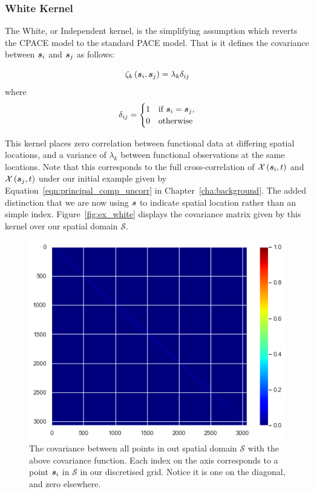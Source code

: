 \subsubsection{White Kernel \label{sssec:white_kern}}
The White, or Independent kernel, is the simplifying assumption which reverts the CPACE model to the standard PACE model. That is it defines the covariance between $\bm{{s}}_{i}$ and $\bm{{s}}_{j}$ as follows:

\begin{equation}
	\zeta_k\left(\bm{{s}}_{i}, \bm{{s}}_{j}\right) = \lambda_k\delta_{ij}
\end{equation}
where 
\begin{equation*}
\delta_{ij} = \begin{cases}
	1 & \text{if } \bm{{s}}_{i} = \bm{{s}}_{j}, \\
	0 & \text{otherwise}
\end{cases} 
\end{equation*}

This kernel places zero correlation between functional data at differing spatial locations, and a variance of $\lambda_k$ between functional observations at the same locations.
Note that this corresponds to the full cross-correlation of $\mathcal{X}\left(\bm{{s}}_{i}, t \right)$ and  $\mathcal{X}\left(\bm{{s}}_{j}, t \right)$ under our initial example given by Equation~\ref{eqn:principal_comp_uncorr} in Chapter~\ref{cha:background}.
The added distinction that we are now using $\bm{{s}}$ to indicate spatial location rather than an simple index.
Figure~\ref{fig:ex_white} displays the covariance matrix given by this kernel over our spatial domain $\mathcal{S}$. 

\begin{figure}
	\centering
	\includegraphics[width=\textwidth]{ex_white}
	\caption{The covariance between all points in out spatial domain $\mathcal{S}$ with the above covariance function. Each index on the axis corresponds to a point $\bm{{s}}_i$ in $\mathcal{S}$ in our discretised grid. Notice it is one on the diagonal, and zero elsewhere.}
	\label{fig:ex_whiite}
\end{figure}

